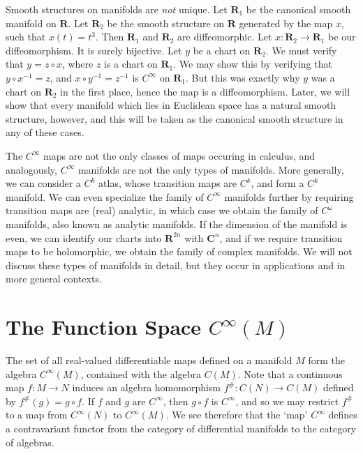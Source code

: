 \begin{example}
    Smooth structures on manifolds are {\it not} unique. Let $\mathbf{R}_1$ be the canonical smooth manifold on $\mathbf{R}$. Let $\mathbf{R}_2$ be the smooth structure on $\mathbf{R}$ generated by the map $x$, such that $x(t) = t^3$. Then $\mathbf{R}_1$ and $\mathbf{R}_2$ are diffeomorphic. Let $x:\mathbf{R}_2 \to \mathbf{R}_1$ be our diffeomorphism. It is surely bijective. Let $y$ be a chart on $\mathbf{R}_2$. We must verify that $y = z \circ x$, where $z$ is a chart on $\mathbf{R}_1$. We may show this by verifying that $y \circ x^{-1} = z$, and $x \circ y^{-1} = z^{-1}$ is $C^\infty$ on $\mathbf{R}_1$. But this was exactly why $y$ was a chart on $\mathbf{R}_2$ in the first place, hence the map is a diffeomorphism. Later, we will show that every manifold which lies in Euclidean space has a natural smooth structure, however, and this will be taken as the canonical smooth structure in any of these cases.
\end{example}

The $C^\infty$ maps are not the only classes of maps occuring in calculus, and analogously, $C^\infty$ manifolds are not the only types of manifolds. More generally, we can consider a $C^k$ atlas, whose transition maps are $C^k$, and form a $C^k$ manifold. We can even specialize the family of $C^\infty$ manifolds further by requiring transition maps are (real) analytic, in which case we obtain the family of $C^\omega$ manifolds, also known as analytic manifolds. If the dimension of the manifold is even, we can identify our charts into $\mathbf{R}^{2n}$ with $\mathbf{C}^n$, and if we require transition maps to be holomorphic, we obtain the family of complex manifolds. We will not discuss these types of manifolds in detail, but they occur in applications and in more general contexts.

\section{The Function Space $C^\infty(M)$}

The set of all real-valued differentiable maps defined on a manifold $M$ form the algebra $C^\infty(M)$, contained with the algebra $C(M)$. Note that a continuous map $f: M \to N$ induces an algebra homomorphism $f^\#: C(N) \to C(M)$ defined by $f^\#(g) = g \circ f$. If $f$ and $g$ are $C^\infty$, then $g \circ f$ is $C^\infty$, and so we may restrict $f^\#$ to a map from $C^\infty(N)$ to $C^\infty(M)$. We see therefore that the `map' $C^\infty$ defines a contravariant functor from the category of differential manifolds to the category of algebras.

